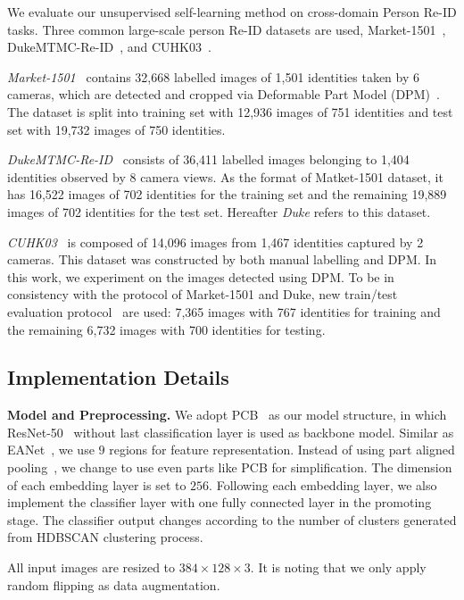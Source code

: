 \documentclass[10pt,twocolumn,letterpaper]{article}
\begin{document}
We evaluate our unsupervised self-learning method on cross-domain Person Re-ID tasks. Three common large-scale person Re-ID datasets are used, Market-1501~\cite{market1501}, DukeMTMC-Re-ID~\cite{duke}, and CUHK03~\cite{cuhk03}.

\textit{Market-1501}~\cite{market1501} contains 32,668 labelled images of 1,501 identities taken by 6 cameras, which are detected and cropped via Deformable Part Model (DPM)~\cite{DPM}. The dataset is split into training set with 12,936 images of 751 identities and test set with 19,732 images of 750 identities. 

\textit{DukeMTMC-Re-ID}~\cite{duke} consists of 36,411 labelled images belonging to 1,404 identities observed by 8 camera views. As the format of Matket-1501 dataset, it has 16,522 images of 702 identities for the training set and the remaining 19,889 images of 702 identities for the test set. 
Hereafter \emph{Duke} refers to this dataset.

\textit{CUHK03}~\cite{cuhk03} is composed of 14,096 images from 1,467 identities captured by 2 cameras. This dataset was constructed by both manual labelling and DPM. In this work, we experiment on the images detected using DPM. To be in consistency with the protocol of Market-1501 and Duke, new train/test evaluation protocol~\cite{rerank} are used: 7,365 images with 767 identities for training and the remaining 6,732 images with 700 identities for testing.

\subsection{Implementation Details}
\textbf{Model and Preprocessing.} We adopt PCB~\cite{PCB} as our model structure, in which ResNet-50~\cite{resnet50} without last classification layer is used as backbone model. Similar as EANet~\cite{EANet}, we use $9$ regions for feature representation. Instead of using part aligned pooling~\cite{EANet}, we change to use even parts like PCB for simplification. The dimension of each embedding layer is set to $256$. Following each embedding layer, we also implement the classifier layer with one fully connected layer in the promoting stage. The classifier output changes according to the number of clusters generated from HDBSCAN clustering process.

All input images are resized to $384\times128\times3$. It is noting that we only apply random flipping as data augmentation.
\end{document}
